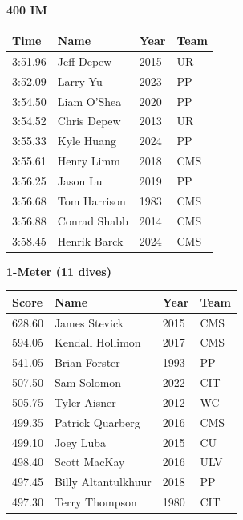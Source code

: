 \vspace{1.2em}
\noindent\begin{minipage}[t]{0.98\textwidth}
\centering
\textbf{\textcolor{teamprimary}{400 IM}}\par
\vspace{0.5em}
\centering
\small
\renewcommand{\arraystretch}{1.0}
\setlength{\tabcolsep}{4pt}
\begin{tabular}{@{}p{2.5cm}p{4.5cm}p{1.5cm}p{2.5cm}@{}}
\toprule
\textbf{Time} & \textbf{Name} & \textbf{Year} & \textbf{Team} \\
\midrule
3:51.96 & Jeff Depew & 2015 & UR \\
3:52.09 & Larry Yu & 2023 & PP \\
3:54.50 & Liam O'Shea & 2020 & PP \\
3:54.52 & Chris Depew & 2013 & UR \\
3:55.33 & Kyle Huang & 2024 & PP \\
3:55.61 & Henry Limm & 2018 & CMS \\
3:56.25 & Jason Lu & 2019 & PP \\
3:56.68 & Tom Harrison & 1983 & CMS \\
3:56.88 & Conrad Shabb & 2014 & CMS \\
3:58.45 & Henrik Barck & 2024 & CMS \\
\bottomrule
\end{tabular}
\end{minipage}
\vspace{1.2em}
\noindent\begin{minipage}[t]{0.98\textwidth}
\centering
\textbf{\textcolor{teamprimary}{1-Meter (11 dives)}}\par
\vspace{0.5em}
\centering
\small
\renewcommand{\arraystretch}{1.0}
\setlength{\tabcolsep}{4pt}
\begin{tabular}{@{}p{2.5cm}p{4.5cm}p{1.5cm}p{2.5cm}@{}}
\toprule
\textbf{Score} & \textbf{Name} & \textbf{Year} & \textbf{Team} \\
\midrule
628.60 & James Stevick & 2015 & CMS \\
594.05 & Kendall Hollimon & 2017 & CMS \\
541.05 & Brian Forster & 1993 & PP \\
507.50 & Sam Solomon & 2022 & CIT \\
505.75 & Tyler Aisner & 2012 & WC \\
499.35 & Patrick Quarberg & 2016 & CMS \\
499.10 & Joey Luba & 2015 & CU \\
498.40 & Scott MacKay & 2016 & ULV \\
497.45 & Billy Altantulkhuur & 2018 & PP \\
497.30 & Terry Thompson & 1980 & CIT \\
\bottomrule
\end{tabular}
\end{minipage}

